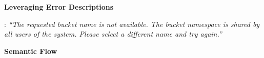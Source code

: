 \textbf{Leveraging Error Descriptions}

: \textit{``The requested bucket name is not available. The bucket namespace is shared by all users of the system. Please select a different name and try again.''}

\textbf{Semantic Flow}


%
%
%
%
%
%
%
%
%
